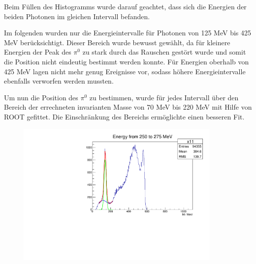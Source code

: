 \documentclass[a4paper,11pt,oneside,final,german,openbib,pdftex]{scrbook}
\begin{document}
{Beim Füllen des Histogramms wurde darauf geachtet, dass sich die Energien der beiden Photonen im gleichen Intervall befanden.


Im folgenden wurden nur die Energieintervalle f\"ur Photonen von 125 MeV bis 425 MeV ber\"ucksichtigt.
Dieser Bereich wurde bewusst gew\"ahlt, da f\"ur kleinere Energien der Peak des $\pi^0$ zu stark durch das Rauschen gest\"ort wurde und somit die Position nicht eindeutig bestimmt werden konnte. F\"ur Energien oberhalb von 425 MeV lagen nicht mehr genug Ereignisse vor, sodass h\"ohere Energieintervalle ebenfalls verworfen werden mussten. 


Um nun die Position des $\pi^0$ zu bestimmen, wurde für jedes Intervall über den Bereich der errechneten invarianten Masse von 70 MeV bis 220 MeV mit Hilfe von ROOT gefittet. Die Einschr\"ankung des Bereichs erm\"oglichte einen besseren Fit.


\begin{figure}[h!]
	\begin{center}
		\includegraphics[width=100mm]{FitExampleRealDataEnergyIntervalSymmetricPhotons}
		

\end{center}
\end{figure}}
\end{document}
